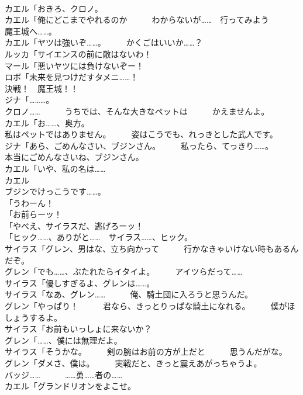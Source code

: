 \documentclass[8pt]{extreport}
\begin{document}
\begin{CJK}{UTF8}{min}
\\	カエル「おきろ、クロノ。	
\\	カエル「俺にどこまでやれるのか　　　わからないが……　行ってみよう　　　魔王城へ……。	
\\	カエル「ヤツは強いぞ……。　　　かくごはいいか……？	
\\	ルッカ「サイエンスの前に敵はないわ！	
\\	マール「悪いヤツには負けないぞー！	
\\	ロボ「未来を見つけだすタメニ……！	
\\	決戦！　魔王城！！	
\\	ジナ「………。	
\\	クロノ……　　　うちでは、そんな大きなペットは　　　かえませんよ。	
\\	カエル「お……、奥方。	
\\	私はペットではありません。　　　姿はこうでも、れっきとした武人です。	
\\	ジナ「あら、ごめんなさい、ブジンさん。　　　私ったら、てっきり……。　　　本当にごめんなさいね、ブジンさん。	
\\	カエル「いや、私の名は……	
\\	カエル
\\	ブジンでけっこうです……。	
\\	「うわーん！	
\\	「お前らーッ！	
\\	「やべえ、サイラスだ、逃げろーッ！	
\\	「ヒック……、ありがと……　サイラス……、ヒック。	
\\	サイラス「グレン、男はな、立ち向かって　　　行かなきゃいけない時もあるんだぞ。	
\\	グレン「でも……、ぶたれたらイタイよ。　　　アイツらだって……	
\\	サイラス「優しすぎるよ、グレンは……。	
\\	サイラス「なあ、グレン……　　　俺、騎土団に入ろうと思うんだ。	
\\	グレン「やっぱり！　　　君なら、きっとりっぱな騎土になれる。　　　僕がほしょうするよ。	
\\	サイラス「お前もいっしょに来ないか？	
\\	グレン「……、僕には無理だよ。	
\\	サイラス「そうかな。　　　剣の腕はお前の方が上だと　　　思うんだがな。	
\\	グレン「ダメさ、僕は。　　　実戦だと、きっと震えあがっちゃうよ。	
\\	バッジ……　　　……勇……者の……	
\\	カエル「グランドリオンをよこせ。	

\end{CJK}
\end{document}
